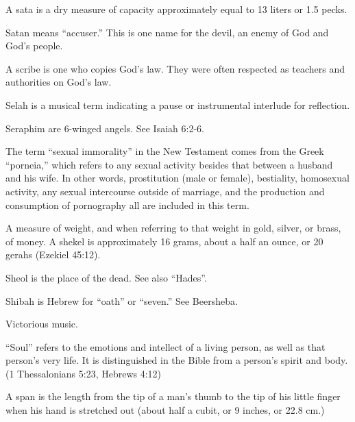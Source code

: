 {\par }{\ILIB A sata is a dry measure of capacity approximately equal to 13 liters or 1.5 pecks.
\par }{
\par }{\ILIB Satan means “accuser.” This is one name for the devil, an enemy of God and God’s people.
\par }{
\par }{\ILIB A scribe is one who copies God’s law. They were often respected as teachers and authorities on God’s law.
\par }{
\par }{\ILIB Selah is a musical term indicating a pause or instrumental interlude for reflection.
\par }{
\par }{\ILIB Seraphim are 6-winged angels. See Isaiah 6:2-6.
\par }{
\par }{\ILIB The term “sexual immorality” in the New Testament comes from the Greek “porneia,” which refers to any sexual activity besides that between a husband and his wife. In other words, prostitution (male or female), bestiality, homosexual activity, any sexual intercourse outside of marriage, and the production and consumption of pornography all are included in this term.
\par }{
\par }{\ILIB A measure of weight, and when referring to that weight in gold, silver, or brass, of money. A shekel is approximately 16 grams, about a half an ounce, or 20 gerahs (Ezekiel 45:12).
\par }{
\par }{\ILIB Sheol is the place of the dead. See also “Hades”.
\par }{
\par }{\ILIB Shibah is Hebrew for “oath” or “seven.” See Beersheba.
\par }{
\par }{\ILIB Victorious music.
\par }{
\par }{\ILIB “Soul” refers to the emotions and intellect of a living person, as well as that person’s very life. It is distinguished in the Bible from a person’s spirit and body. (1 Thessalonians 5:23, Hebrews 4:12)
\par }{
\par }{\ILIB A span is the length from the tip of a man’s thumb to the tip of his little finger when his hand is stretched out (about half a cubit, or 9 inches, or 22.8 cm.)
}
